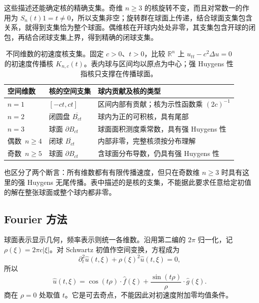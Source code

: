 这些描述还能确定核的精确支集。奇维 \(n\geq3\) 的核旋转不变，而且对常数一的作用为 \(S_n(t)1=t\ne0\)，所以支集非空；旋转群在球面上传递，结合球面支集包含关系，就得到支集恰为整个球面。偶维核在开球内处处非零，其支集包含开球的闭包，再结合闭球支集上界，得到精确的闭球支集。

\begin{table}[htbp]
\centering
\small
\setlength{\tabcolsep}{5pt}
\caption[不同维数的初速度核支集]{不同维数的初速度核支集。固定 \(c>0\)、\(t>0\)，比较 \(\mathbb R^n\) 上 \(u_{tt}-c^2\Delta u=0\) 的初速度传播核 \(K_{n,c}(t)\)。表内球与区间均以原点为中心；强 Huygens 性指核只支撑在传播球面。}
\label{b2:tab:11-dimension-kernel-support}
\begin{tabularx}{\linewidth}{@{}>{\raggedright\arraybackslash}p{2.6cm}>{\raggedright\arraybackslash}p{2.5cm}>{\raggedright\arraybackslash}X@{}}
\toprule
空间维数 & 核的空间支集 & 球内贡献及核的类型 \\
\midrule
\mbox{\(n=1\)} & \([-ct,ct]\) & 区间内部有贡献；核为示性函数乘 \((2c)^{-1}\) \\
\mbox{\(n=2\)} & 闭圆盘 \(\overline{B_{ct}}\) & 球内为正的可积核，具有尾部 \\
\mbox{\(n=3\)} & 球面 \(\partial B_{ct}\) & 球面面积测度乘常数，具有强 Huygens 性 \\
\mbox{偶数 \(n\geq4\)} & 闭球 \(\overline{B_{ct}}\) & 内部非零，完整核须按分布理解 \\
\mbox{奇数 \(n\geq5\)} & 球面 \(\partial B_{ct}\) & 含球面分布导数，仍具有强 Huygens 性 \\
\bottomrule
\end{tabularx}
\end{table}

也区分了两个断言：所有维数都有有限传播速度，但只在奇数维 \(n\geq3\) 时具有这里的强 Huygens 无尾传播。表中描述的是核的支集，不能据此要求任意给定初值的解在整张球面或整个球内都非零。

\subsection{Fourier 方法}
\label{b2:subsec:110303}

球面表示显示几何，频率表示则统一各维数。沿用第二编的 \(2\pi\) 归一化，记 \(\rho(\xi)=2\pi c|\xi|\)。对 Schwartz 初值作空间变换，方程成为
\[
 \partial_t^2\widehat u(t,\xi)+\rho(\xi)^2\widehat u(t,\xi)=0,
\]
所以
\begin{equation}\label{b2:eq:11-fourier-wave}
 \widehat u(t,\xi)=\cos(t\rho)\cdot\widehat f(\xi)
             +\dfrac{\sin(t\rho)}{\rho}\cdot\widehat g(\xi).
\end{equation}
商在 \(\rho=0\) 处取值 \(t\)。它是可去奇点，不能因此对初速度附加零均值条件。

